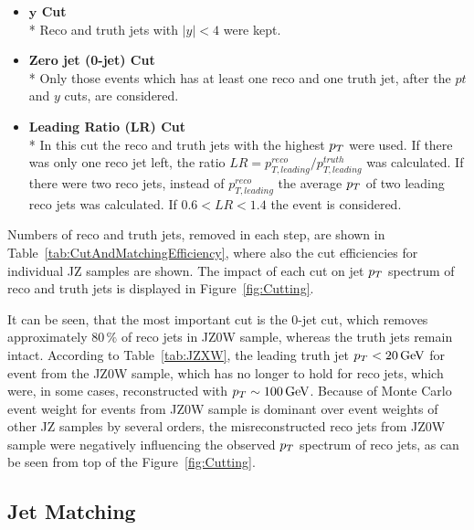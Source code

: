 \begin{itemize}

  \item \textbf{$\mathbf{y}$ Cut}
  \\*
    Reco and truth jets with $|y| < 4$ were kept.

  \item \textbf{Zero jet (0-jet) Cut}
  \\*
    Only those events which has at least one reco and one truth jet, after the
    $pt$ and $y$ cuts, are considered.
    
  \item \textbf{Leading Ratio (LR) Cut}
  \\*
    In this cut the reco and truth jets with the highest $p_{T}$ were used. If
    there was only one reco jet left, the ratio $LR = p_{T,leading}^{reco} /
    p_{T,leading}^{truth}$ was calculated. If there were two reco jets, instead
    of $p_{T,leading}^{reco}$ the average $p_{T}$ of two leading reco jets was
    calculated. If $0.6 < LR < 1.4$ the event is considered.

\end{itemize}

Numbers of reco and truth jets, removed in each step, are shown in
Table~\ref{tab:CutAndMatchingEfficiency}, where also the cut efficiencies for
individual JZ samples are shown. The impact of each cut on jet $p_{T}$ spectrum
of reco and truth jets is displayed in Figure~\ref{fig:Cutting}. 

It can be seen, that the most important cut is the 0-jet cut, which removes
approximately $80\,\%$ of reco jets in JZ0W sample, whereas the truth jets
remain intact. According to Table~\ref{tab:JZXW}, the leading truth jet $p_{T} <
20 \,\text{GeV}$ for event from the JZ0W sample, which has no longer to hold for reco
jets, which were, in some cases, reconstructed with $p_{T} \sim 100 \,\text{GeV}$. Because
of Monte Carlo event weight for events from JZ0W sample is dominant over event
weights of other JZ samples by several orders, the misreconstructed reco jets
from JZ0W sample were negatively influencing the observed $p_{T}$ spectrum of reco
jets, as can be seen from top of the Figure~\ref{fig:Cutting}.

\subsection{Jet Matching}
\label{SubSec:JetMatching}

